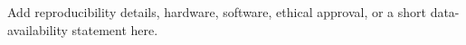 Add reproducibility details, hardware, software, ethical approval, or a short
data-availability statement here.

